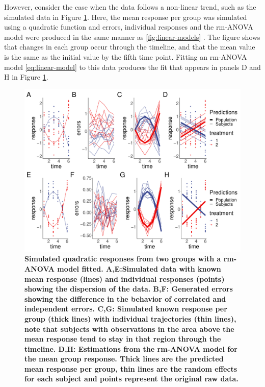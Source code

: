 \documentclass[
]{article}
\begin{document}
However, consider the case when the data follows a non-linear trend, such as the simulated data in Figure \ref{fig:quadratic-response}. Here, the mean response per group was simulated using a quadratic function and errors, individual responses and the rm-ANOVA model were produced in the same manner as \ref{fig:linear-models} . The figure shows that changes in each group occur through the timeline, and that the mean value is the same as the initial value by the fifth time point. Fitting an rm-ANOVA model \eqref{eq:linear-model} to this data produces the fit that appears in panels D and H in Figure \ref{fig:quadratic-response}.

\begin{figure}
\centering
\includegraphics{Manuscript_AM_v2_files/figure-latex/quadratic-response-1.pdf}
\caption{\label{fig:quadratic-response}\textbf{Simulated quadratic responses from two groups with a rm-ANOVA model fitted. A,E:Simulated data with known mean response (lines) and individual responses (points) showing the dispersion of the data. B,F: Generated errors showing the difference in the behavior of correlated and independent errors. C,G: Simulated known response per group (thick lines) with individual trajectories (thin lines), note that subjects with observations in the area above the mean response tend to stay in that region through the timeline. D,H: Estimations from the rm-ANOVA model for the mean group response. Thick lines are the predicted mean response per group, thin lines are the random effects for each subject and points represent the original raw data.}}
\end{figure}
\end{document}
